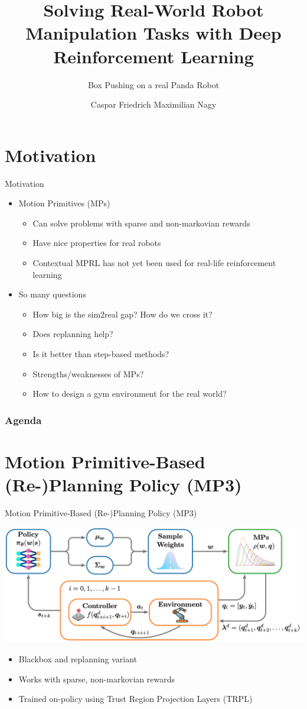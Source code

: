 \documentclass[16:9,en,navbarinfooter]{sdqbeamer}
\author{Caspar Friedrich Maximilian Nagy}
\title{Solving Real-World Robot Manipulation Tasks with Deep Reinforcement Learning}
\subtitle{Box Pushing on a real Panda Robot}
\begin{document}
\KITtitleframe{}


\section{Motivation}
\begin{frame}{Motivation}
\begin{itemize}
    \item Motion Primitives (MPs)
   \begin{itemize}
       \item Can solve problems with sparse and non-markovian rewards
       \item Have nice properties for real robots
       \item Contextual MPRL has not yet been used for real-life reinforcement learning
   \end{itemize}
   \item So many questions
   \begin{itemize}
           \item How big is the sim2real gap? How do we cross it?
           \item Does replanning help?
           \item Is it better than step-based methods?
           \item Strengths/weaknesses of MPs? 
           \item How to design a gym environment for the real world?
   \end{itemize}
\end{itemize}

\end{frame}

\begin{frame}
\frametitle{Agenda}
    \vspace{.5cm}
\tableofcontents
\end{frame}

\section{Motion Primitive-Based (Re-)Planning Policy (MP3)}
\begin{frame}{Motion Primitive-Based (Re-)Planning Policy (MP3)}

\center 
    \vspace{1cm}
\includegraphics[width=.7\linewidth]{media/mp3.png}
\begin{itemize}
\item Blackbox and replanning variant
\item Works with sparse, non-markovian rewards
\item Trained on-policy using Trust Region Projection Layers (TRPL)
\end{itemize}
\end{frame}
\end{document}
